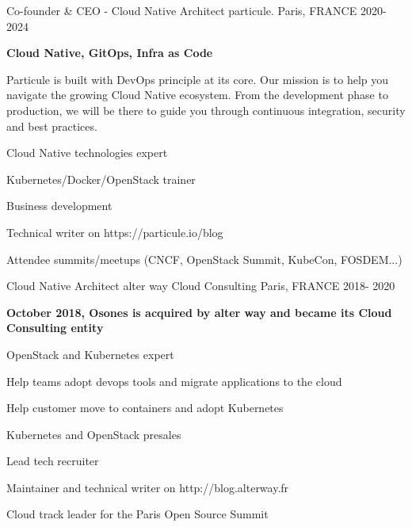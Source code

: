 \begin{cventries}
{    }
%
\cventry
    {Co-founder \& CEO - Cloud Native Architect} %
    {particule.} %
    {Paris, FRANCE} %
    {2020-2024} %
    {
      \begin{cvitems} %
      \item {\textbf{Cloud Native, GitOps, Infra as Code}}
      \item {Particule is built with DevOps principle at its core. Our mission
        is to help you navigate the growing Cloud Native ecosystem. From the
          development phase to production, we will be there to guide you
          through continuous integration, security and best practices.}
        \item {Cloud Native technologies expert}
        \item {Kubernetes/Docker/OpenStack trainer}
        \item {Business development}
        \item {Technical writer on https://particule.io/blog}
        \item {Attendee summits/meetups (CNCF, OpenStack Summit, KubeCon, FOSDEM...)}
      \end{cvitems}
    }

  \cventry
    {Cloud Native Architect} %
    {alter way Cloud Consulting} %
    {Paris, FRANCE} %
    {2018- 2020} %
    {
      \begin{cvitems} %
      \item {\textbf{October 2018, Osones is acquired by alter way and became
        its Cloud Consulting entity}}
      \item {OpenStack and Kubernetes expert}
      \item {Help teams adopt devops tools and migrate applications to the
        cloud}
      \item {Help customer move to containers and adopt Kubernetes}
      \item {Kubernetes and OpenStack presales}
      \item {Lead tech recruiter}
      \item {Maintainer and technical writer on http://blog.alterway.fr}
      \item {Cloud track leader for the Paris Open Source Summit}
      \end{cvitems}
    }


\end{cventries}
